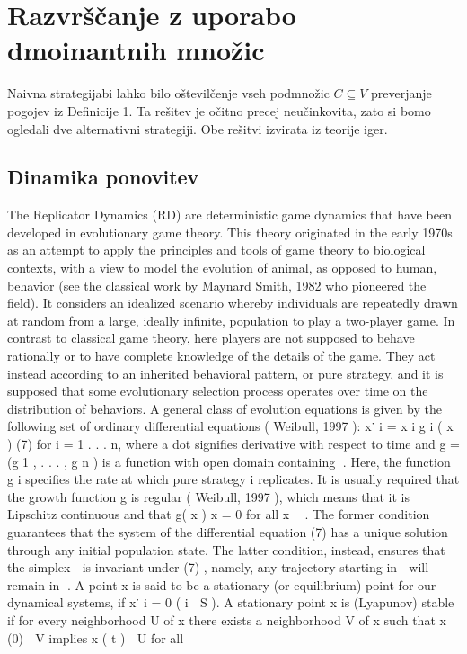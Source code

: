 \documentclass[a4paper]{article}
\begin{document}
\section{Razvrščanje z uporabo dmoinantnih množic}
Naivna strategijabi lahko bilo oštevilčenje vseh podmnožic $C\subseteq V$ preverjanje pogojev iz Definicije 1. Ta rešitev je očitno precej neučinkovita, zato si bomo ogledali dve alternativni strategiji. Obe rešitvi izvirata iz teorije iger.

\subsection{Dinamika ponovitev}
The Replicator Dynamics (RD) are deterministic game dynamics
that have been developed in evolutionary game theory. This theory
originated in the early 1970s as an attempt to apply the principles
and tools of game theory to biological contexts, with a view to
model the evolution of animal, as opposed to human, behavior
(see the classical work by Maynard Smith, 1982 who pioneered
the field). It considers an idealized scenario whereby individuals
are repeatedly drawn at random from a large, ideally infinite,
population to play a two-player game. In contrast to classical
game theory, here players are not supposed to behave rationally
or to have complete knowledge of the details of the game. They
act instead according to an inherited behavioral pattern, or pure
strategy, and it is supposed that some evolutionary selection
process operates over time on the distribution of behaviors. A
general class of evolution equations is given by the following set
of ordinary differential equations ( Weibull, 1997 ):
x˙ i = x i g i ( x ) (7)
for i = 1 . . . n, where a dot signifies derivative with respect to time
and g = (g 1 , . . . , g n ) is a function with open domain containing .
Here, the function g i specifies the rate at which pure strategy i
replicates. It is usually required that the growth function g is regular
( Weibull, 1997 ), which means that it is Lipschitz continuous
and that g( x ) 	 x = 0 for all x ∈ . The former condition guarantees
that the system of the differential equation (7) has a unique
solution through any initial population state. The latter condition,
instead, ensures that the simplex  is invariant under (7) , namely,
any trajectory starting in  will remain in .
A point x is said to be a stationary (or equilibrium) point for
our dynamical systems, if x˙ i = 0 ( i ∈ S ). A stationary point x is
(Lyapunov) stable if for every neighborhood U of x there exists a
neighborhood V of x such that x (0) ∈ V implies x ( t ) ∈ U for all
\end{document}
